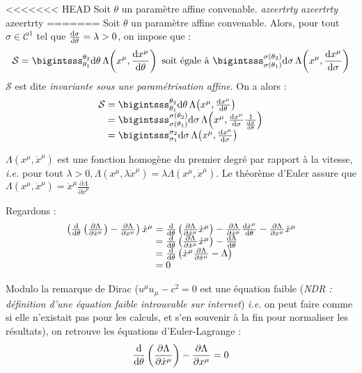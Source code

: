 <<<<<<< HEAD
Soit $\theta$ un paramètre affine convenable. \textsl{azeertrty} \emph{azeertrty} azeertrty
=======
Soit $\theta$ un paramètre affine convenable. Alors, pour tout $\sigma \in \mathcal{C}^1$ tel que $\frac{\mathrm{d}\sigma}{\mathrm{d}\theta}=\lambda>0$, on impose que :
$$
	\mathcal{S}=\bigintsss_{\theta_1}^{\theta_2}\dif\theta\,\Lambda\!\left(x^\mu,\frac{\dif x^\mu}{\dif\theta}\right) \text{ soit égale à } \bigintsss_{\sigma(\theta_1)}^{\sigma(\theta_2)}\dif\sigma\,\Lambda\!\left(x^\mu,\frac{\dif x^\mu}{\dif\sigma}\right) 
$$
$\mathcal{S}$ est dite \emph{invariante sous une paramétrisation affine}. On a alors :
$$
	\begin{array}{r@{\;}l}
		\mathcal{S}&=\bigintsss_{\theta_1}^{\theta_2}\dif\theta\,\Lambda\!\left(x^\mu,\frac{\dif x^\mu}{\dif\theta}\right)\\
			&=\bigintsss_{\sigma(\theta_1)}^{\sigma(\theta_2)}\dif\sigma\,\Lambda\!\left(x^\mu,\frac{\dif x^\mu}{\dif\sigma}\frac{1}{\frac{\dif\sigma}{\dif\theta}}\right)\\
			&=\bigintsss_{\sigma_1}^{\sigma_2}\dif\sigma\,\Lambda\!\left(x^\mu,\frac{\dif x^\mu}{\dif\sigma}\right)
	\end{array}
$$

{\txt $ \Lambda(x^\mu,\dot{x}^\mu)$ est une fonction homogène du premier degré par rapport à la vitesse, \emph{i.e.} pour tout $\lambda>0, \Lambda(x^\mu,\lambda\dot{x}^\mu)=\lambda\Lambda(x^\mu,\dot{x}^\mu)$.
Le théorème d'Euler assure que $\Lambda(x^\mu,\dot{x}^\mu)=\dot{x}^\mu\frac{\partial\Lambda}{\partial\dot{x}^\mu}$}

Regardons :
$$
	\begin{array}{l@{\;}l}
		\left(\frac{\dif}{\dif\theta}\left(\frac{\partial\Lambda}{\partial\dot{x}^\mu}\right)-\frac{\partial\Lambda}{\partial x^\mu}\right)\dot{x}^\mu&= \frac{\dif}{\dif \theta}\left(\frac{\partial\Lambda}{\partial\dot{x}^\mu}\dot{x}^\mu\right)-\frac{\partial \Lambda}{\partial \dot{x}^\mu}\frac{\dif \dot{x}^\mu}{\dif\theta}-\frac{\partial \Lambda}{\partial x^\mu}\dot{x}^\mu\\
			&=\frac{\dif}{\dif\theta}\left(\frac{\partial\Lambda}{\partial\dot{x}^\mu}\dot{x}^\mu\right)-\frac{\dif\Lambda}{\dif \theta}\\
			&=\frac{\dif}{\dif\theta}\left(\dot{x}^\mu\frac{\partial \Lambda}{\partial \dot{x}^\mu}-\Lambda\right)\\
			&=0
	\end{array}
$$

\begin{conc}
	Modulo la remarque de Dirac (\og  $u^\mu u_\mu-c^2=0$ est une équation faible \fg (\emph{NDR : définition d'une équation faible introuvable sur internet}) \emph{i.e.} on peut faire comme si elle n'existait pas pour les calculs, et s'en souvenir à la fin pour normaliser les résultats), on retrouve les équations d'Euler-Lagrange :
$$
	\frac{\mathrm{d}}{\mathrm{d} \theta}\left(\frac{\partial\Lambda}{\partial \dot{x}^\mu}\right)-\frac{\partial\Lambda}{\partial x^\mu}=0
$$
\end{conc}


